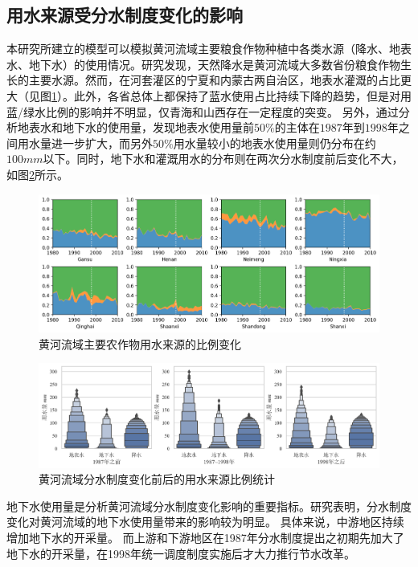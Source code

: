 \subsection{用水来源受分水制度变化的影响}

本研究所建立的模型可以模拟黄河流域主要粮食作物种植中各类水源（降水、地表水、地下水）的使用情况。研究发现，天然降水是黄河流域大多数省份粮食作物生长的主要水源。然而，在河套灌区的宁夏和内蒙古两自治区，地表水灌溉的占比更大（见图\ref{ch6:fig:sources}）。此外，各省总体上都保持了蓝水使用占比持续下降的趋势，但是对用蓝/绿水比例的影响并不明显，仅青海和山西存在一定程度的突变。
另外，通过分析地表水和地下水的使用量，发现地表水使用量前$50\%$的主体在$1987$年到$1998$年之间用水量进一步扩大，而另外$50\%$用水量较小的地表水使用量则仍分布在约$100mm$以下。同时，地下水和灌溉用水的分布则在两次分水制度前后变化不大，如图\ref{ch6:fig:sources_change}所示。


\begin{figure}[htb]
    \centering
    \includegraphics[width=\textwidth]{img/ch6/ch6_green_blue_water.png}
    \caption{黄河流域主要农作物用水来源的比例变化}\label{ch6:fig:sources}
\end{figure}

\begin{figure}[htb]
    \centering
    \includegraphics[width=\textwidth]{img/ch6/ch6_sources_change.png}
    \caption{黄河流域分水制度变化前后的用水来源比例统计}\label{ch6:fig:sources_change}
\end{figure}

地下水使用量是分析黄河流域分水制度变化影响的重要指标。研究表明，分水制度变化对黄河流域的地下水使用量带来的影响较为明显。
具体来说，中游地区持续增加地下水的开采量。
而上游和下游地区在1987年分水制度提出之初期先加大了地下水的开采量，在1998年统一调度制度实施后才大力推行节水改革。

